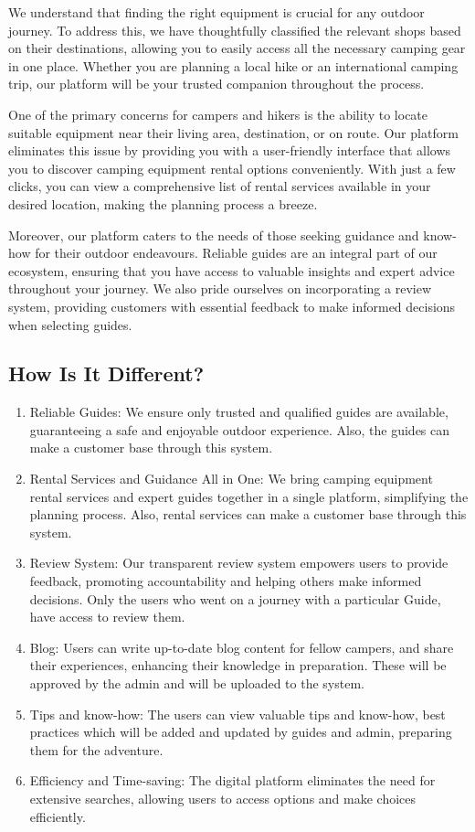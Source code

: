 We understand that finding the right equipment is crucial for any outdoor journey. To address this, we have thoughtfully classified the relevant shops based on their destinations, allowing you to easily access all the necessary camping gear in one place. Whether you are planning a local hike or an international camping trip, our platform will be your trusted companion throughout the process.

One of the primary concerns for campers and hikers is the ability to locate suitable equipment near their living area, destination, or on route. Our platform eliminates this issue by providing you with a user-friendly interface that allows you to discover camping equipment rental options conveniently. With just a few clicks, you can view a comprehensive list of rental services available in your desired location, making the planning process a breeze.

Moreover, our platform caters to the needs of those seeking guidance and know-how for their outdoor endeavours. Reliable guides are an integral part of our ecosystem, ensuring that you have access to valuable insights and expert advice throughout your journey. We also pride ourselves on incorporating a review system, providing customers with essential feedback to make informed decisions when selecting guides.


\subsection{How Is It Different?}
\begin{enumerate}
    \item Reliable Guides: We ensure only trusted and qualified guides are available, guaranteeing a safe and enjoyable outdoor experience. Also, the guides can make a customer base through this system.
    \item Rental Services and Guidance All in One: We bring camping equipment rental services and expert guides together in a single platform, simplifying the planning process. Also, rental services can make a customer base through this system.
    \item Review System: Our transparent review system empowers users to provide feedback, promoting accountability and helping others make informed decisions. Only the users who went on a journey with a particular Guide, have access to review them.
    \item Blog: Users can write up-to-date blog content for fellow campers, and share their experiences, enhancing their knowledge in preparation. These will be approved by the admin and will be uploaded to the system. 
    \item Tips and know-how: The users can view valuable tips and know-how, best practices which will be added and updated by guides and admin, preparing them for the adventure.
    \item Efficiency and Time-saving: The digital platform eliminates the need for extensive searches, allowing users to access options and make choices efficiently.



\end{enumerate}